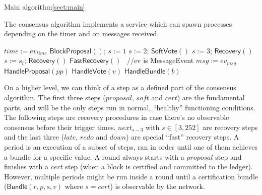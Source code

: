 \documentclass[10pt,a4paper]{article}
\begin{document}
\begin{section}{Main algorithm}\ref{sect:main}
%

The consensus algorithm implements a service which can spawn processes depending on the 
timer and on messages received.

\begin{algorithm}[H]
    \caption{\underline{Main node algorithm}}
    \label{algo:main}
    \begin{algorithmic}[1]
    
        \State $time := ev_{time}$
            \State $\mathsf{BlockProposal}()$; $s:=1$
            \State $s:=2$; $\mathsf{SoftVote}()$
            \State $s:=3$; $\mathsf{Recovery}()$
        \ElsIf{$time\in[\max\{4\lambda, \Lambda \} + 2^{s_t-3}\lambda, \max\{4\lambda, \Lambda \} + 2^{s_t-2}\lambda)$ for some $s\le s_t \le 252$}
            \State $s:=s_t $; $\mathsf{Recovery}()$
            \State $\mathsf{FastRecovery}()$
        \EndIf
    \Else \ //ev is MessageEvent
        \State $msg := ev_{msg}$
            \State $\mathsf{HandleProposal}(pp)$
            \State $\mathsf{HandleVote}(v)$
            \State $\mathsf{HandleBundle}(b)$
        \EndIf
    \EndIf

    \EndFunction
    \end{algorithmic}
\end{algorithm}

On a higher level, we can think of a step as a defined part of the consensus algorithm. The first three steps
($proposal$, $soft$ and $cert$)
are the fundamental parts, and will be the only steps run in normal, ``healthy'' functioning conditions.
The following steps are recovery procedures in case there's no observable consensus before their trigger times.
$next_{s-3}$ with $s \in [3, 252]$ are recovery steps and the last three ($late$, $redo$ and $down$)
are special ``fast'' recovery steps.
A period is an execution of a subset of steps, ran in order until one of them achieves 
a bundle for a specific value. A round always starts with a $proposal$ step and finishes with a $cert$
step (when a block is certified and committed to the ledger). However, multiple periods might
be run inside a round until a certification bundle ($\mathsf{Bundle}(r,p,s,v) $ where $s = cert$) is observable by the network.


\end{section}
\end{document}
